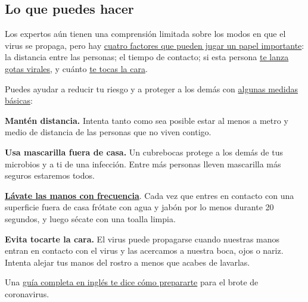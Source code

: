\hypertarget{lo-que-puedes-hacer}{%
\subsection{Lo que puedes hacer}\label{lo-que-puedes-hacer}}

Los expertos aún tienen una comprensión limitada sobre los modos en que
el virus se propaga, pero hay
\href{https://www.nytimes3xbfgragh.onion/es/2020/03/03/espanol/ciencia-y-tecnologia/coronavirus-como-se-transmite.html}{cuatro
factores que pueden jugar un papel importante}: la distancia entre las
personas; el tiempo de contacto; si esta persona
\href{https://www.nytimes3xbfgragh.onion/es/2020/07/08/espanol/ciencia-y-tecnologia/coronavirus-aire-aerosoles.html}{te
lanza gotas virales}, y cuánto
\href{https://www.nytimes3xbfgragh.onion/es/2020/03/06/espanol/estilos-de-vida/no-te-toques-la-cara.html}{te
tocas la cara}.

Puedes ayudar a reducir tu riesgo y a proteger a los demás con
\href{https://www.nytimes3xbfgragh.onion/es/article/el-coronavirus-proteger-preparar.html}{algunas
medidas básicas}:

\textbf{Mantén distancia.} Intenta tanto como sea posible estar al menos
a metro y medio de distancia de las personas que no viven contigo.

\textbf{Usa mascarilla fuera de casa.} Un cubrebocas protege a los demás
de tus microbios y a ti de una infección. Entre más personas lleven
mascarilla más seguros estaremos todos.

\textbf{\href{https://www.nytimes3xbfgragh.onion/es/2020/03/19/espanol/ciencia-y-tecnologia/como-lavarse-las-manos-coronavirus.html}{Lávate
las manos con frecuencia}}. Cada vez que entres en contacto con una
superficie fuera de casa frótate con agua y jabón por lo menos durante
20 segundos, y luego sécate con una toalla limpia.

\textbf{Evita tocarte la cara.} El virus puede propagarse cuando
nuestras manos entran en contacto con el virus y las acercamos a nuestra
boca, ojos o nariz. Intenta alejar tus manos del rostro a menos que
acabes de lavarlas.

Una
\href{https://www.nytimes3xbfgragh.onion/interactive/2020/world/coronavirus-tips-advice.html}{guía
completa en inglés te dice cómo prepararte} para el brote de
coronavirus.

